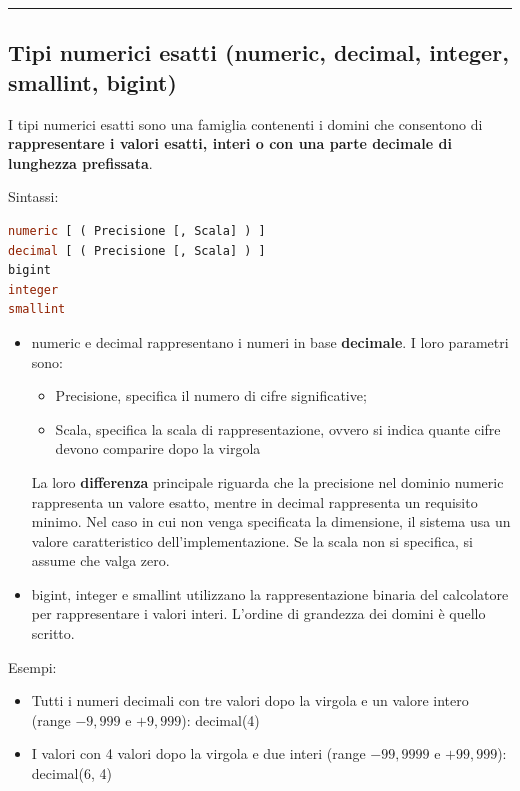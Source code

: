 \documentclass[a4paper]{article}
\newcommand{\longline}{\noindent\rule{\textwidth}{0.4pt}}
\begin{document}
	\longline
	
	\subsection{Tipi numerici esatti (\textsf{numeric}, \textsf{decimal}, \textsf{integer}, \textsf{smallint}, \textsf{bigint})}
	
	I tipi numerici esatti sono una famiglia contenenti i domini che consentono di \textbf{rappresentare i valori esatti, interi o con una parte decimale di lunghezza prefissata}.\newline
	
	\noindent
	Sintassi:
	\begin{lstlisting}[language=SQL]
numeric [ ( Precisione [, Scala] ) ]
decimal [ ( Precisione [, Scala] ) ]
bigint
integer
smallint \end{lstlisting}
	\begin{itemize}
		\item \textsf{numeric} e \textsf{decimal} rappresentano i numeri in base \textbf{decimale}. I loro parametri sono:
		\begin{itemize}
			\item Precisione, specifica il numero di cifre significative;
			\item Scala, specifica la scala di rappresentazione, ovvero si indica quante cifre devono comparire dopo la virgola
		\end{itemize}
		La loro \textbf{differenza} principale riguarda che la precisione nel dominio \textsf{numeric} rappresenta un valore esatto, mentre in \textsf{decimal} rappresenta un requisito minimo. Nel caso in cui non venga specificata la dimensione, il sistema usa un valore caratteristico dell'implementazione. Se la scala non si specifica, si assume che valga zero.
		
		\item \textsf{bigint}, \textsf{integer} e \textsf{smallint} utilizzano la rappresentazione binaria del calcolatore per rappresentare i valori interi. L'ordine di grandezza dei domini è quello scritto.
	\end{itemize}\:\newline

	\noindent
	Esempi:
	\begin{itemize}
		\item Tutti i numeri decimali con tre valori dopo la virgola e un valore intero (range $-9,999$ e $+9,999$): \textsf{decimal(4)}
		\item I valori con 4 valori dopo la virgola e due interi (range $-99,9999$ e $+99,999$): \textsf{decimal(6, 4)}
	\end{itemize}\newpage
	
\end{document}
